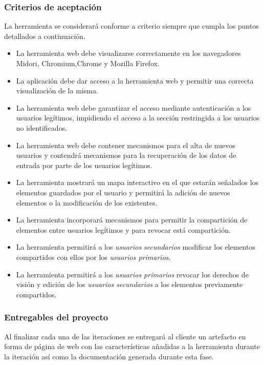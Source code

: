 		\subsubsection{Criterios de aceptación}
		\label{subsubsection:criterios-aceptacion}
		La herramienta se considerará conforme a criterio siempre que cumpla los puntos detallados a continuación.
		
		\begin{itemize}[label={$\bullet$},labelindent=\parindent,leftmargin=2cm]
			\item La herramienta web debe visualizarse correctamente en los navegadores Midori, Chromium,Chrome y Mozilla Firefox.
			\item La aplicación debe dar acceso a la herramienta web y permitir una correcta visualización de la misma.
			\item La herramienta web debe garantizar el acceso mediante autenticación a los usuarios legítimos, impidiendo el acceso a la sección restringida a los usuarios no identificados.
			\item La herramienta web debe contener mecanismos para el alta de nuevos usuarios y contendrá mecanismos para la recuperación de los datos de entrada por parte de los usuarios legítimos.
			\item La herramienta mostrará un mapa interactivo en el que estarán señalados los elementos guardados por el usuario y permitirá la adición de nuevos elementos o la modificación de los existentes.
			\item La herramienta incorporará mecanismos para permitir la compartición de elementos entre usuarios legítimos y para revocar está compartición.
			\item La herramienta permitirá a los \textit{usuarios secundarios} modificar los elementos compartidos con ellos por los \textit{usuarios primarios}.
			\item La herramienta permitirá a los \textit{usuarios primarios} revocar los derechos de visión y edición de los \textit{usuarios secundarios} a los elementos previamente compartidos.
		\end{itemize}

		\subsubsection{Entregables del proyecto}
		Al finalizar cada una de las iteraciones se entregará al cliente un artefacto en forma de página de web con las características añadidas a la herramienta durante la iteración así como la documentación generada durante esta fase.
		
